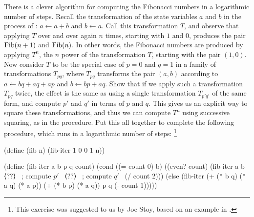 \begin{exercise}
	\label{Exercise 1.19}
	There is a clever algorithm for computing the Fibonacci numbers in a logarithmic number of steps.
	Recall the transformation of the state variables \( a \) and \( b \) in the  process of :
	\( a \gets a + b \) and \( b \gets a \).
	Call this transformation \( T \), and observe that applying \( T \) over and over again \( n \) times, starting with \( 1 \) and \( 0 \), produces the pair \( \operatorname{Fib} (n + 1) \) and \( \operatorname{Fib}(n) \).
	In other words, the Fibonacci numbers are produced by applying \( T^n \), the \( n \) power of the transformation \( T \), starting with the pair \( (1, 0) \).
	Now consider \( T \) to be the special case of \( p = 0 \) and \( q = 1 \) in a family of transformations \( T_{pq} \), where \( T_{pq} \) transforms the pair \( (a, b) \) according to \( a \gets bq + aq + ap \) and \( b \gets bp + aq \).
	Show that if we apply such a transformation \( T_{pq} \) twice, the effect is the same as using a single transformation \( T_{p' q'} \) of the same form, and compute \( p'\) and \( q' \) in terms of \( p \) and \( q \).
	This gives us an explicit way to square these transformations, and thus we can compute \( T^n \) using successive squaring, as in the  procedure.
	Put this all together to complete the following procedure, which runs in a logarithmic number of steps:%
	\footnote{
		This exercise was suggested to us by Joe Stoy, based on an example in .
	}
	\begin{scheme}
	  (define (fib n)
	    (fib-iter 1 0 0 1 n))

	  (define (fib-iter a b p q count)
	    (cond ((= count 0) b)
	          ((even? count)
	           (fib-iter a
	                     b
	                     ⟨??⟩   ~\textrm{; compute \( p' \)}~
	                     ⟨??⟩   ~\textrm{; compute \( q' \)}~
	                     (/ count 2)))
	          (else (fib-iter (+ (* b q) (* a q) (* a p))
	                          (+ (* b p) (* a q))
	                          p
	                          q
	                          (- count 1)))))
	\end{scheme}
\end{exercise}
